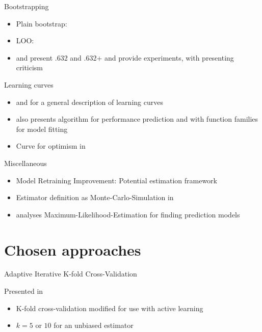 \documentclass{beamer}
\begin{document}
\begin{frame}{Bootstrapping}
	\begin{itemize}
		\item Plain bootstrap: \cite{Kohavi1995}
		\item LOO: \cite{BorraEtAl2010}
		\item \cite{Efron1983} and \cite{EfronEtAl1997} present .632 and .632+ and provide experiments, with \cite{WoodEtAl2007} presenting criticism
	\end{itemize}
\end{frame}
\begin{frame}{Learning curves}
	\begin{itemize}
		\item \cite{PerlichEtAl2003} and \cite{FigueroaEtal2012} for a general description of learning curves
		\item \cite{FigueroaEtal2012} also presents algorithm for performance prediction and with \cite{Singh2005} function families for model fitting
		\item Curve for optimism in \cite{CortesEtal1993}
	\end{itemize}
\end{frame}
\begin{frame}{Miscellaneous}
	\begin{itemize}
		\item Model Retraining Improvement: Potential estimation framework \cite{EvansEtAl2015}
		\item Estimator definition as Monte-Carlo-Simulation in \cite{RoyEtAl2001}
		\item \cite{KadieEtal1995} analyses Maximum-Likelihood-Estimation for finding prediction models
	\end{itemize}
\end{frame}

\section{Chosen approaches}
\begin{frame}{Adaptive Iterative K-fold Cross-Validation}
	\begin{description}
		\item[Presented in \cite{BrumenEtal2004}]
	\end{description}
	\begin{itemize}
		\item K-fold cross-validation modified for use with active learning
		\item $k=5$ or $10$ for an unbiased estimator \cite{Kohavi1995,AirolaEtAl2001}
	\end{itemize}
\end{frame}
\end{document}
